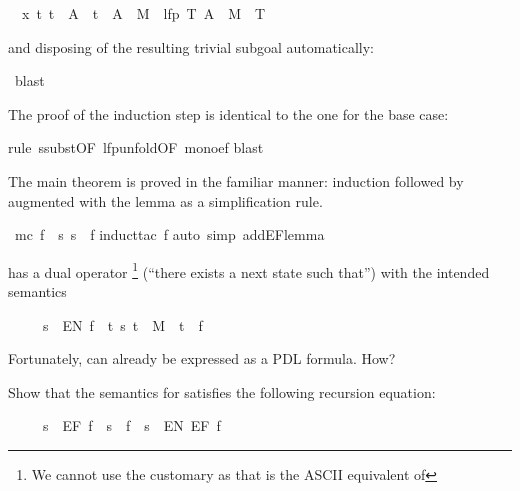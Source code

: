 \begin{isabellebody}
\begin{isamarkuptxt}
\begin{isabelle}
\ {}{\isachardot}\ {\isasymAnd}x\ t{\isachardot}\ t\ {\isasymin}\ A\ {\isasymLongrightarrow}\ t\ {\isasymin}\ A\ {\isasymunion}\ M{\isasyminverse}\ {\isacharbackquote}{\isacharbackquote}\ lfp\ {\isacharparenleft}{\isasymlambda}T{\isachardot}\ A\ {\isasymunion}\ M{\isasyminverse}\ {\isacharbackquote}{\isacharbackquote}\ T{\isacharparenright}%
\end{isabelle}
and disposing of the resulting trivial subgoal automatically:%
\end{isamarkuptxt}%
\ blast{\isacharparenright}%
\begin{isamarkuptxt}%
\noindent
The proof of the induction step is identical to the one for the base case:%
\end{isamarkuptxt}%
rule\ ssubst{\isacharbrackleft}OF\ lfp{\isacharunderscore}unfold{\isacharbrackleft}OF\ mono{\isacharunderscore}ef{\isacharbrackright}{\isacharbrackright}{\isacharparenright}\isanewline
{}blast{\isacharparenright}\isanewline
{}%
\begin{isamarkuptext}%
The main theorem is proved in the familiar manner: induction followed by
 augmented with the lemma as a simplification rule.%
\end{isamarkuptext}%
\ {\isachardoublequote}mc\ f\ {\isacharequal}\ {\isacharbraceleft}s{\isachardot}\ s\ {\isasymTurnstile}\ f{\isacharbraceright}{\isachardoublequote}\isanewline
{}induct{\isacharunderscore}tac\ f{\isacharparenright}\isanewline
{}auto\ simp\ add{\isacharcolon}EF{\isacharunderscore}lemma{\isacharparenright}\isanewline
{}%
\begin{isamarkuptext}%
\begin{exercise}
 has a dual operator \footnote{We cannot use the customary 
as that is the ASCII equivalent of \isa{{\isasymexists}}}
(``there exists a next state such that'') with the intended semantics
\begin{isabelle}%
\ \ \ \ \ s\ {\isasymTurnstile}\ EN\ f\ {\isacharequal}\ {\isacharparenleft}{\isasymexists}t{\isachardot}\ {\isacharparenleft}s{\isacharcomma}\ t{\isacharparenright}\ {\isasymin}\ M\ {\isasymand}\ t\ {\isasymTurnstile}\ f{\isacharparenright}%
\end{isabelle}
Fortunately,  can already be expressed as a PDL formula. How?

Show that the semantics for  satisfies the following recursion equation:
\begin{isabelle}%
\ \ \ \ \ s\ {\isasymTurnstile}\ EF\ f\ {\isacharequal}\ {\isacharparenleft}s\ {\isasymTurnstile}\ f\ {\isasymor}\ s\ {\isasymTurnstile}\ EN\ {\isacharparenleft}EF\ f{\isacharparenright}{\isacharparenright}%
\end{isabelle}
\end{exercise}
%
\end{isamarkuptext}%
\end{isabellebody}%
